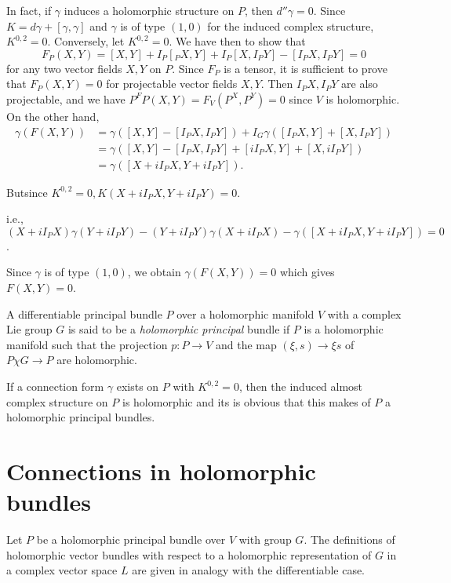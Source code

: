 In fact, if $\gamma$ induces a holomorphic structure on $P$, then $d''
\gamma = 0$. Since $K = d \gamma + [\gamma, \gamma]$ and $\gamma$ is
of type $(1, 0)$ for the induced complex structure, $K^{0, 2} =
0$. Conversely, let $K^{0, 2} = 0$. We have then to show that 
$$
F_P (X, Y) = [X, Y] + I_P [_P X, Y] + I_P [X, I_P Y] - [I_P X, I_P Y] = 0
$$
for any two vector fields $X, Y$ on $P$. Since $F_P$ is a tensor, it
is sufficient to prove that $F_P (X, Y) = 0$ for projectable vector
fields $X, Y$. Then $I_P X, I_P Y$ are also projectable, and we have
$P^F P (X, Y)=  F_V (P^X, P^Y) = 0$ since $V$ is holomorphic. On the
other hand, 
\begin{align*}
  \gamma (F(X, Y)) & = \gamma ([X, Y] - [I_P X, I_P Y]) + I_G \gamma
  ([I_P X, Y] + [X, I_P Y])\\ 
  & = \gamma ([X, Y] - [I_P X, I_P Y] + [iI_P X, Y] + [X, iI_PY])\\
  & = \gamma ([X + iI_PX, Y + iI_PY]).
\end{align*}

But\pageoriginale since $K^{0, 2} = 0, K(X + iI_P X, Y + iI_PY ) = 0$.

i.e., $(X + iI_PX) \gamma (Y + iI_PY) - (Y + iI_PY) \gamma (X + iI_PX)
- \gamma ([X + iI_PX, Y + iI_PY]) = 0$. 

Since $\gamma$ is of type $(1, 0)$, we obtain $\gamma (F(X, Y)) = 0$
which gives $F(X, Y) = 0$.  

\begin{defn}\label{chap6:sec4:def4}%
  A differentiable principal bundle $P$ over a holomorphic manifold
  $V$ with a complex Lie group $G$ is said to be a {\em holomorphic
    principal} bundle if $P$ is a holomorphic manifold such that the
  projection $p : P \to V$ and the map $(\xi , s )\to \xi s$ of $P
  \chi G \to P$ are holomorphic. 
\end{defn} 

If a connection form $\gamma$ exists on $P$ with $K^{0, 2} = 0$, then
the induced almost complex structure on $P$ is holomorphic and its is
obvious that this makes of $P$ a holomorphic principal bundles. 

\section{Connections in holomorphic bundles}\label{chap6:sec5}%

Let $P$ be a holomorphic principal bundle over $V$ with group $G$. The
definitions of holomorphic vector bundles with respect to a
holomorphic representation of $G$ in a complex vector space $L$ are
given in analogy with the differentiable case. 

